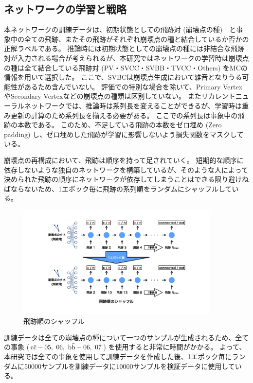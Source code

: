 \subsection{ネットワークの学習と戦略} \label{Net:VLSTM:TrainingandStrategyofVLSTM}

本ネットワークの訓練データは、初期状態としての飛跡対 (崩壊点の種)　と事象中の全ての飛跡、またその飛跡がそれぞれ崩壊点の種と結合しているか否かの正解ラベルである。
推論時には初期状態としての崩壊点の種には非結合な飛跡対が入力される場合が考えられるが、本研究ではネットワークの学習時は崩壊点の種は全て結合している飛跡対 (PV・SVCC・SVBB・TVCC・Others) をMCの情報を用いて選択した。
ここで、SVBCは崩壊点生成において雑音となりうる可能性があるため含んでいない。
評価での特別な場合を除いて、Primary VertexやSecondary Vertexなどの崩壊点の種類は区別していない。
またリカレントニューラルネットワークでは、推論時は系列長を変えることができるが、学習時は重み更新の計算のため系列長を揃える必要がある。
ここでの系列長は事象中の飛跡の本数である。
このため、不足している飛跡の本数をゼロ埋め (Zero padding) し、ゼロ埋めした飛跡が学習に影響しないよう損失関数をマスクしている。

崩壊点の再構成において、飛跡は順序を持って足されていく。
短期的な順序に依存しないような独自のネットワークを構築しているが、そのような人によって決められた飛跡の順序にネットワークが依存してしまうことはできる限り避けねばならないため、1エポック毎に飛跡の系列順をランダムにシャッフルしている。

\begin{figure}[htbp]
 \centering
 \includegraphics[width=0.9\textwidth]{Figure/3Networks/3-4-3-1TrackShuffle.png}
 \caption{飛跡順のシャッフル}
 \label{3-4-3-1TrackShuffle}
\end{figure}

訓練データは全ての崩壊点の種について一つのサンプルが生成されるため、全ての事象 ($\rm c\bar{c}-05,\ 06,\ \rm b\bar{b}-06,\ 07$) を使用すると非常に時間がかかる。
よって、本研究では全ての事象を使用して訓練データを作成した後、1エポック毎にランダムに$50000$サンプルを訓練データに$10000$サンプルを検証データに使用している。



